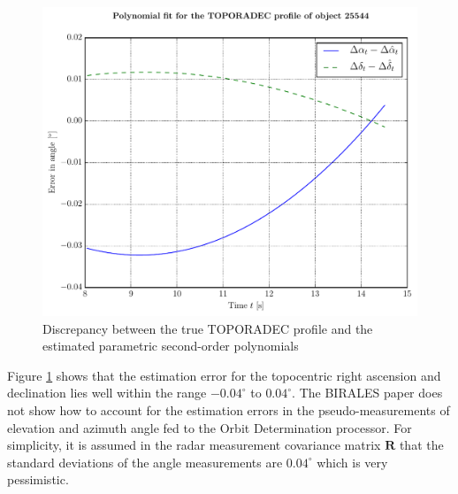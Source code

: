 \documentclass[conference]{IEEEtran}
\begin{document}
\begin{figure}[ht]
	\centering
	\includegraphics[scale=0.39]{main057iss41polynomerror01.pdf}
	\caption[Estimation errors in polynomial fit for the right ascension/declination profile]{Discrepancy between the true TOPORADEC profile and the estimated parametric second-order polynomials}
	\label{fig:od2:observest:polynomerror:2}
\end{figure}
Figure \ref{fig:od2:observest:polynomerror:2} shows that the estimation error for the topocentric right ascension and declination lies well within the range $-0.04^\circ$ to $0.04^\circ$. The BIRALES paper \cite{surrey814139} does not show how to account for the estimation errors in the pseudo-measurements of elevation and azimuth angle fed to the Orbit Determination processor. For simplicity, it is assumed in the radar measurement covariance matrix $\mathbf{R}$ that the standard deviations of the angle measurements are $0.04^\circ$ which is very pessimistic.
\end{document}
